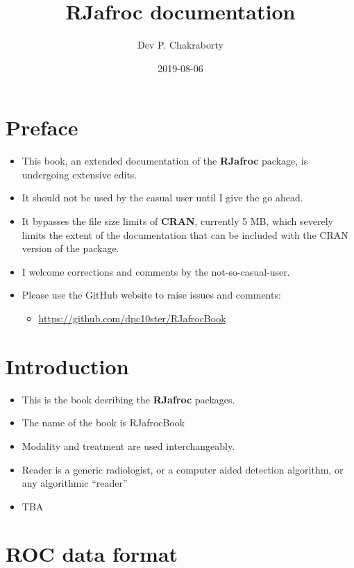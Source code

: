 \documentclass[]{book}
\title{RJafroc documentation}
\author{Dev P. Chakraborty}
\date{2019-08-06}
\providecommand{\tightlist}{%
  \setlength{\itemsep}{0pt}\setlength{\parskip}{0pt}}
\begin{document}
\maketitle

{
\setcounter{tocdepth}{1}
\tableofcontents
}
\hypertarget{preface}{%
\chapter{Preface}\label{preface}}

\begin{itemize}
\tightlist
\item
  This book, an extended documentation of the \textbf{RJafroc} package, is undergoing extensive edits.
\item
  It should not be used by the casual user until I give the go ahead.
\item
  It bypasses the file size limits of \textbf{CRAN}, currently 5 MB, which severely limits the extent of the documentation that can be included with the CRAN version of the package.
\item
  I welcome corrections and comments by the not-so-casual-user.
\item
  Please use the GitHub website to raise issues and comments:

  \begin{itemize}
  \tightlist
  \item
    \url{https://github.com/dpc10ster/RJafrocBook}
  \end{itemize}
\end{itemize}

\hypertarget{intro}{%
\chapter{Introduction}\label{intro}}

\begin{itemize}
\tightlist
\item
  This is the book desribing the \textbf{RJafroc} packages.
\item
  The name of the book is RJafrocBook
\item
  Modality and treatment are used interchangeably.
\item
  Reader is a generic radiologist, or a computer aided detection algorithm, or any algorithmic ``reader''
\item
  TBA
\end{itemize}

\hypertarget{rocdataformat}{%
\chapter{ROC data format}\label{rocdataformat}}
\end{document}
